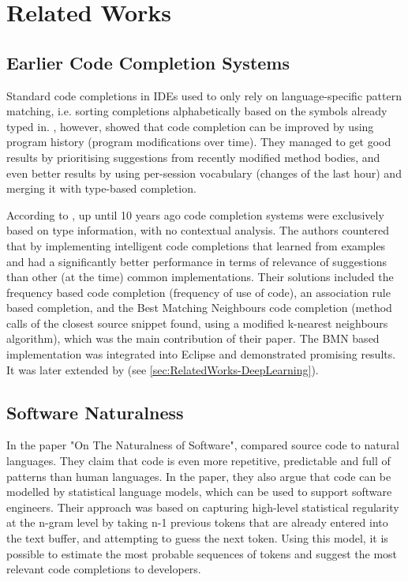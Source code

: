 \chapter{Related Works}
\label{chap:RelatedWorks}

\section{Earlier Code Completion Systems}
\label{sec:RelatedWorks-EarlierSystems}
Standard code completions in IDEs used to only rely on language-specific pattern matching, i.e. sorting completions alphabetically based on the symbols already typed in. \cite{Robb08a}, however, showed that code completion can be improved by using program history (program modifications over time). They managed to get good results by prioritising suggestions from recently modified method bodies, and even better results by using per-session vocabulary (changes of the last hour) and merging it with type-based completion.

According to \cite{Bruc09a}, up until 10 years ago code completion systems were exclusively based on type information, with no contextual analysis. The authors countered that by implementing intelligent code completions that learned from examples and had a significantly better performance in terms of relevance of suggestions than other (at the time) common implementations. Their solutions included the frequency based code completion (frequency of use of code), an association rule based completion, and the Best Matching Neighbours code completion (method calls of the closest source snippet found, using a modified k-nearest neighbours algorithm), which was the main contribution of their paper. The BMN based implementation was integrated into Eclipse and demonstrated promising results. It was later extended by \cite{Prok15a} (see \ref{sec:RelatedWorks-DeepLearning}).

\section{Software Naturalness}
\label{sec:RelatedWorks-SoftwareNaturalness}
In the paper "On The Naturalness of Software", \cite{Hind12a} compared source code to natural languages. They claim that code is even more repetitive, predictable and full of patterns than human languages. In the paper, they also argue that code can be modelled by statistical language models, which can be used to support software engineers. Their approach was based on capturing high-level statistical regularity at the n-gram level by taking n-1 previous tokens that are already entered into the text buffer, and attempting to guess the next token. Using this model, it is possible to estimate the most probable sequences of tokens and suggest the most relevant code completions to developers.

